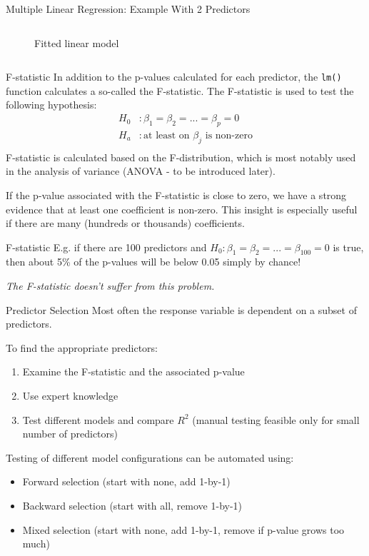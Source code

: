 \begin{frame}{Multiple Linear Regression: Example With 2 Predictors}
\begin{columns}
\begin{column}{0.5\linewidth}
\begin{figure}
            Fitted linear model
            \end{figure}
        \end{column}
    \end{columns}
\end{frame}

\begin{frame}{F-statistic}
    In addition to the p-values calculated for each predictor,
    the {\small \texttt{lm()}} function calculates a so-called the F-statistic.
    The F-statistic is used to test the following hypothesis:
    \begin{align*}
        H_0&: \beta_1 = \beta_2 = ... = \beta_p = 0 \\
        H_a&: \text{at least on $\beta_j$ is non-zero}\\
    \end{align*}
    F-statistic is calculated based on the F-distribution, which is most notably
    used in the analysis of variance (ANOVA - to be introduced later).

    If the p-value associated with the F-statistic is close to zero, we have
    a strong evidence that at least one coefficient is non-zero. This insight
    is especially useful if there are many (hundreds or thousands) coefficients.
\end{frame}

\begin{frame}{F-statistic}
    E.g. if there are 100 predictors and $H_0: \beta_1 = \beta_2 = ... = \beta_{100} = 0$ is true,
    then about 5\% of the p-values will be below 0.05 simply by chance!

    \emph{The F-statistic doesn't suffer from this problem.}
\end{frame}

\begin{frame}{Predictor Selection}
    Most often the response variable is dependent on a subset of predictors.

    To find the appropriate predictors:
    \begin{enumerate}
        \item Examine the F-statistic and the associated p-value
        \item Use expert knowledge
        \item Test different models and compare $R^2$ (manual testing feasible only for small number of predictors)
    \end{enumerate}

    Testing of different model configurations can be automated using:
    \begin{itemize}
        \item Forward selection (start with none, add 1-by-1)
        \item Backward selection (start with all, remove 1-by-1)
        \item Mixed selection (start with none, add 1-by-1, remove if p-value grows too much)
    \end{itemize}
\end{frame}


